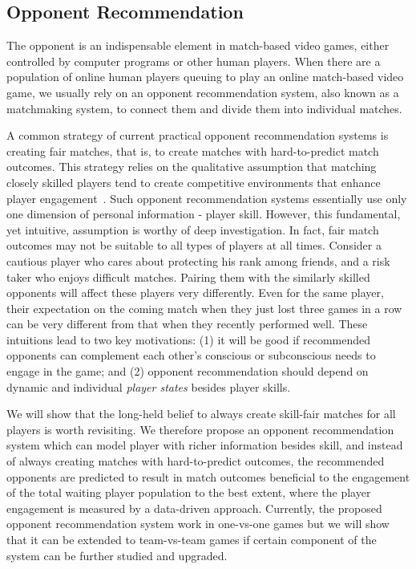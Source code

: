 \subsection{Opponent Recommendation}\label{sec:thesis_overview:oppo_recom}

The opponent is an indispensable element in match-based video games, either controlled by computer programs or other human players. When there are a population of online human players queuing to play an online match-based video game, we usually rely on an opponent recommendation system, also known as a matchmaking system, to connect them and divide them into individual matches. 

A common strategy of current practical opponent recommendation systems is creating fair matches, that is, to create matches with hard-to-predict match outcomes. This strategy relies on the qualitative assumption that matching closely skilled players tend to create competitive environments that enhance player engagement~\cite{sweetser2005gameflow,flow1990psychology,chen2007flow,graepel2006ranking}. Such opponent recommendation systems essentially use only one dimension of personal information - player skill. However, this fundamental, yet intuitive, assumption is worthy of deep investigation. In fact, fair match outcomes may not be suitable to all types of players at all times. Consider a cautious player who cares about protecting his rank among friends, and a risk taker who enjoys difficult matches. Pairing them with the similarly skilled opponents will affect these players very differently. Even for the same player, their expectation on the coming match when they just lost three games in a row can be very different from that when they recently performed well. These intuitions lead to two key motivations: (1) it will be good if recommended opponents can complement each other's conscious or subconscious needs to engage in the game; and (2) opponent recommendation should depend on dynamic and individual \emph{player states} besides player skills.

We will show that the long-held belief to always create skill-fair matches for all players is worth revisiting. We therefore propose an opponent recommendation system which can model player with richer information besides skill, and instead of always creating matches with hard-to-predict outcomes, the recommended opponents are predicted to result in match outcomes beneficial to the engagement of the total waiting player population to the best extent, where the player engagement is measured by a data-driven approach. Currently, the proposed opponent recommendation system work in one-vs-one games but we will show that it can be extended to team-vs-team games if certain component of the system can be further studied and upgraded.  



